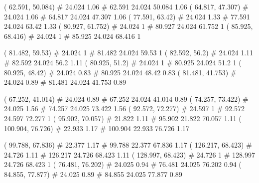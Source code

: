 \documentclass[a4paper,openbib,10pt]{article}
\newenvironment{treegraph}{\begin{graph}}{\end{graph}}
\begin{document}
\begin{treegraph}
  ( 62.591, 50.084) #     24.024    1.06
   #    62.591    24.024    50.084    1.06
  ( 64.817, 47.307) #     24.024    1.06
   #    64.817    24.024    47.307    1.06
  ( 77.591, 63.42) #     24.024    1.33
   #    77.591    24.024    63.42    1.33
  ( 80.927, 61.752) #     24.024    1
   #    80.927    24.024    61.752    1
  ( 85.925, 68.416) #     24.024    1
   #    85.925    24.024    68.416    1

  ( 81.482, 59.53) #     24.024    1
   #    81.482    24.024    59.53    1
  ( 82.592, 56.2) #     24.024    1.11
   #    82.592    24.024    56.2    1.11
  ( 80.925, 51.2) #     24.024    1
   #    80.925    24.024    51.2    1
  ( 80.925, 48.42) #     24.024    0.83
   #    80.925    24.024    48.42    0.83
  ( 81.481, 41.753) #     24.024    0.89
   #    81.481    24.024    41.753    0.89

  ( 67.252, 41.014) #     24.024    0.89
   #    67.252    24.024    41.014    0.89
  ( 74.257, 73.422) #     24.025    1.56
   #    74.257    24.025    73.422    1.56
  ( 92.572, 72.277) #     24.597    1
   #    92.572    24.597    72.277    1
  ( 95.902, 70.057) #     21.822    1.11
   #    95.902    21.822    70.057    1.11
  ( 100.904, 76.726) #     22.933    1.17
   #    100.904    22.933    76.726    1.17

  ( 99.788, 67.836) #     22.377    1.17
   #    99.788    22.377    67.836    1.17
  ( 126.217, 68.423) #     24.726    1.11
   #    126.217    24.726    68.423    1.11
  ( 128.997, 68.423) #     24.726    1
   #    128.997    24.726    68.423    1
  ( 76.481, 76.202) #     24.025    0.94
   #    76.481    24.025    76.202    0.94
  ( 84.855, 77.877) #     24.025    0.89
   #    84.855    24.025    77.877    0.89


\end{treegraph}
\end{document}

